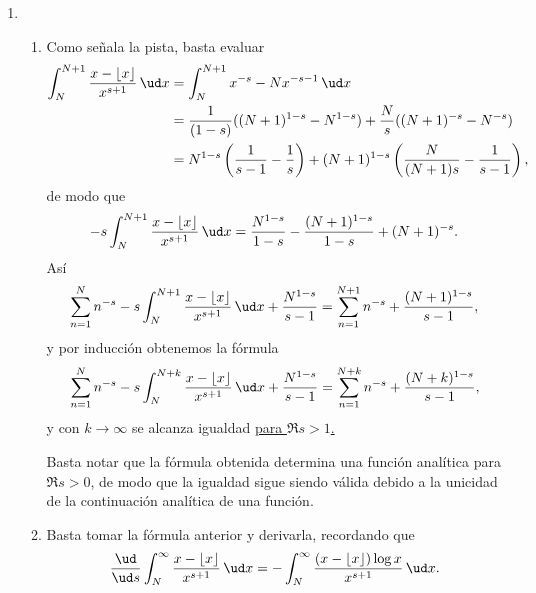 \documentclass[11pt, reqno]{amsart}
\begin{document}
\begin{additional}
\begin{enumerate}
\begin{enumerate}
\begin{figure}[!hbtp]
					\caption{}
					\label{fig:apostol_path_b}
				\end{figure}
		\end{enumerate}

	\item
		\begin{enumerate}
			\item Como señala la pista, basta evaluar
				\begin{align*}
					\int_{N}^{N+1} \frac{x - \lfloor x \rfloor}{x^{s+1}} \, \ud x
					&= \int_{N}^{N+1} x^{-s} - Nx^{-s-1} \, \ud x \\
					&= \frac{1}{(1-s)}((N+1)^{1-s} - N^{1-s}) + \frac{N}{s}((N+1)^{-s} - N^{-s}) \\
					&= N^{1-s}\left( \frac{1}{s - 1} - \frac{1}{s} \right) + (N+1)^{1-s}\left( \frac{N}{(N+1)s} - \frac{1}{s - 1} \right),
				\end{align*}
				de modo que
				\[
					-s\int_{N}^{N+1} \frac{x - \lfloor x \rfloor}{x^{s+1}} \, \ud x
					= \frac{N^{1-s}}{1 - s} - \frac{(N+1)^{1-s}}{1 - s} + (N + 1)^{-s}.
				\]
				Así
				\[
					\sum_{n=1}^{N} n^{-s} -s\int_{N}^{N+1} \frac{x - \lfloor x \rfloor}{x^{s+1}} \, \ud x + \frac{N^{1-s}}{s - 1}
					= \sum_{n=1}^{N+1} n^{-s} + \frac{(N+1)^{1-s}}{s - 1},
				\]
				y por inducción obtenemos la fórmula
				\[
					\sum_{n=1}^{N} n^{-s} -s\int_{N}^{N+k} \frac{x - \lfloor x \rfloor}{x^{s+1}} \, \ud x + \frac{N^{1-s}}{s - 1}
					= \sum_{n=1}^{N+k} n^{-s} + \frac{(N+k)^{1-s}}{s - 1},
				\]
				y con $k \to \infty$ se alcanza igualdad \underline{para $\Re s > 1$.} 

				Basta notar que la fórmula obtenida determina una función analítica para $\Re s > 0$, de modo que la
				igualdad sigue siendo válida debido a la unicidad de la continuación analítica de una función.

			\item Basta tomar la fórmula anterior y derivarla, recordando que
				\[
					\frac{\ud}{\ud s} \int_{N}^{\infty} \frac{x - \lfloor x \rfloor}{x^{s+1}} \, \ud x =
					-\int_{N}^{\infty} \frac{(x - \lfloor x \rfloor)\log x}{x^{s+1}} \, \ud x.
				\]


\end{enumerate}
\end{enumerate}
\end{additional}
\end{document}
